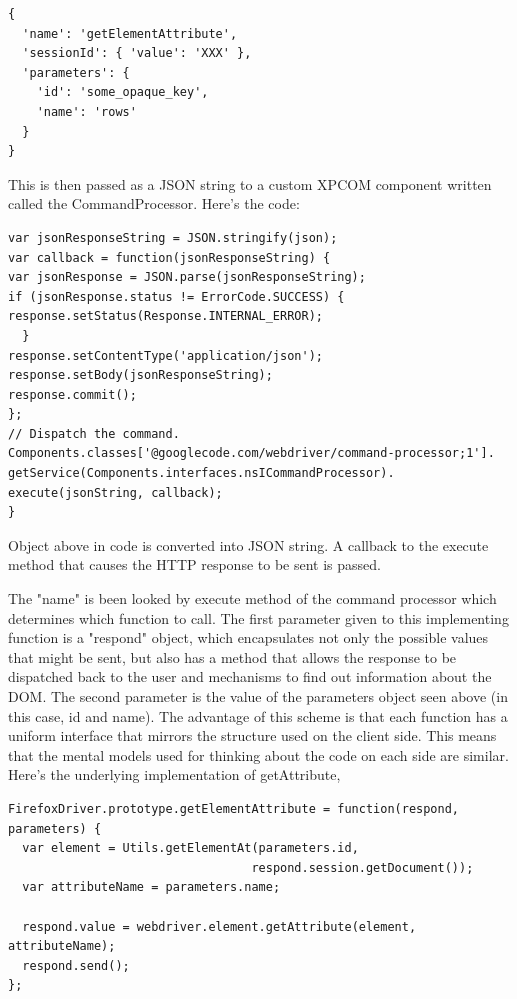 \documentclass[article,type=msc,colorback,accentcolor=tud9c,twoside,11pt]{tudthesis}
\begin{document}
\begin{lstlisting}
{
  'name': 'getElementAttribute',
  'sessionId': { 'value': 'XXX' },
  'parameters': {
    'id': 'some_opaque_key',
    'name': 'rows'
  }
}
\end{lstlisting} 

This is then passed as a JSON string to a custom XPCOM component written called the CommandProcessor. Here's the code:
\begin{lstlisting}
var jsonResponseString = JSON.stringify(json);
var callback = function(jsonResponseString) {
var jsonResponse = JSON.parse(jsonResponseString);
if (jsonResponse.status != ErrorCode.SUCCESS) {
response.setStatus(Response.INTERNAL_ERROR);
  }
response.setContentType('application/json');
response.setBody(jsonResponseString);
response.commit();
};
// Dispatch the command.
Components.classes['@googlecode.com/webdriver/command-processor;1'].
getService(Components.interfaces.nsICommandProcessor).
execute(jsonString, callback);
}
\end{lstlisting}
Object above in code is converted into JSON string. A callback to the execute method that causes the HTTP response to be sent is passed.

 The "name" is been looked by execute method of the command processor which determines which function to call. The first parameter given to this implementing function is a "respond" object, which encapsulates not only the possible values that might be sent, but also has a method that allows the response to be dispatched back to the user and mechanisms to find out information about the DOM. The second parameter is the value of the parameters object seen above (in this case, id and name). The advantage of this scheme is that each function has a uniform interface that mirrors the structure used on the client side. This means that the mental models used for thinking about the code on each side are similar. Here's the underlying implementation of getAttribute,
 
 \begin{lstlisting}
FirefoxDriver.prototype.getElementAttribute = function(respond, parameters) {
  var element = Utils.getElementAt(parameters.id,
                                  respond.session.getDocument());
  var attributeName = parameters.name;

  respond.value = webdriver.element.getAttribute(element, attributeName);
  respond.send();
};
\end{lstlisting}
\end{document}
